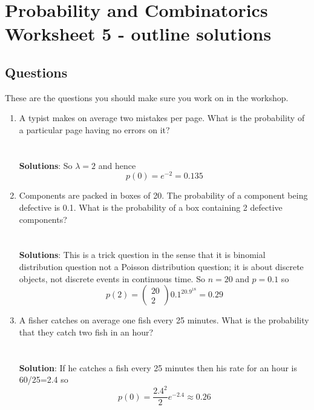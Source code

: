 \documentclass[11pt,a4paper]{scrartcl}
\begin{document}
\section*{Probability and Combinatorics Worksheet 5 - outline solutions}


\subsection*{Questions}

These are the questions you should make sure you work on in the workshop.

\begin{enumerate}

\item A typist makes on average two mistakes per page. What is the probability of a particular page having no errors on it?\\
  \\
  \\
  \textbf{Solutions}: So $\lambda=2$ and hence
  \begin{equation}
    p(0)=e^{-2}=0.135
  \end{equation}  

\item Components are packed in boxes of 20. The probability of a
  component being defective is 0.1. What is the probability of a box
  containing 2 defective components?\\ \\ \\ \textbf{Solutions}: This
  is a trick question in the sense that it is binomial distribution
  question not a Poisson distribution question; it is about discrete
  objects, not discrete events in continuous time. So $n=20$ and $p=0.1$ so
  \begin{equation}
    p(2)=\left(\begin{array}{c}20\\2\end{array}\right)0.1^20.9^{18}=0.29
  \end{equation}
 
\item A fisher catches on average one fish every 25 minutes. What is
  the probability that they catch two fish in an hour?
  \\ \\ \\ \textbf{Solution}: If he catches a fish every 25
  minutes then his rate for an hour is 60/25=2.4 so
\begin{equation}
p(0)=\frac{2.4^2}{2}e^{-2.4}\approx 0.26
\end{equation}


\end{enumerate}
\end{document}
